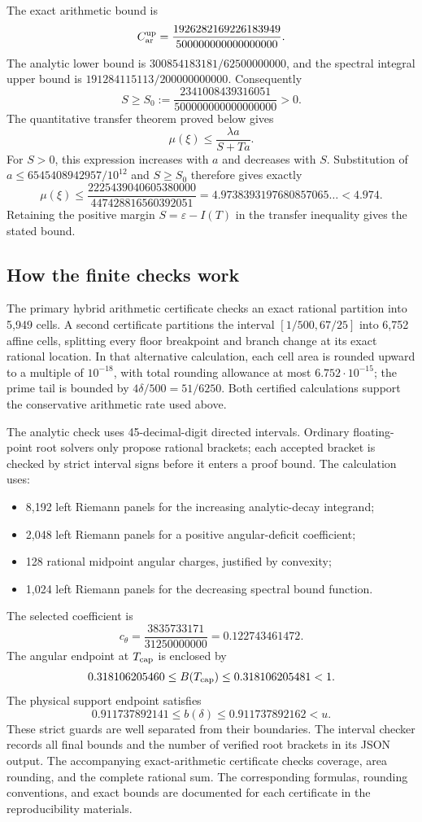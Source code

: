 \documentclass[11pt]{article}
\theoremstyle{definition}\newtheorem{definition}[theorem]{Definition}
\theoremstyle{remark}\newtheorem{remark}[theorem]{Remark}
\begin{document}
The exact arithmetic bound is
\[
 C_{\rm ar}^{\rm up}
 =\frac{1926282169226183949}{500000000000000000}.
\]
The analytic lower bound is $300854183181/62500000000$, and the spectral integral upper bound is $191284115113/200000000000$. Consequently
\[
 S\ge S_0:=\frac{2341008439316051}{500000000000000000}>0.
\]
The quantitative transfer theorem proved below gives
\[
 \mu(\xi)\le\frac{\lambda a}{S+Ta}.
\]
For $S>0$, this expression increases with $a$ and decreases with $S$. Substitution of $a\le6545408942957/10^{12}$ and $S\ge S_0$ therefore gives exactly
\[
 \mu(\xi)\le
 \frac{2225439040605380000}{447428816560392051}
 =4.9738393197680857065\ldots<4.974.
\]
Retaining the positive margin $S=\varepsilon-I(T)$ in the transfer inequality gives the stated bound.

\subsection{How the finite checks work}
The primary hybrid arithmetic certificate checks an exact rational partition into 5,949 cells. A second certificate partitions the interval $[1/500,67/25]$ into 6,752 affine cells, splitting every floor breakpoint and branch change at its exact rational location. In that alternative calculation, each cell area is rounded upward to a multiple of $10^{-18}$, with total rounding allowance at most $6.752\cdot10^{-15}$; the prime tail is bounded by $4\delta/500=51/6250$. Both certified calculations support the conservative arithmetic rate used above.

The analytic check uses 45-decimal-digit directed intervals. Ordinary floating-point root solvers only propose rational brackets; each accepted bracket is checked by strict interval signs before it enters a proof bound. The calculation uses:
\begin{itemize}
\item 8,192 left Riemann panels for the increasing analytic-decay integrand;
\item 2,048 left Riemann panels for a positive angular-deficit coefficient;
\item 128 rational midpoint angular charges, justified by convexity;
\item 1,024 left Riemann panels for the decreasing spectral bound function.
\end{itemize}
The selected coefficient is
\[
 c_\theta=\frac{3835733171}{31250000000}=0.122743461472.
\]
The angular endpoint at $T_{\rm cap}$ is enclosed by
\[
 0.318106205460\le B(T_{\rm cap})\le0.318106205481<1.
\]
The physical support endpoint satisfies
\[
 0.911737892141\le b(\delta)\le0.911737892162<u.
\]
These strict guards are well separated from their boundaries. The interval checker records all final bounds and the number of verified root brackets in its JSON output. The accompanying exact-arithmetic certificate checks coverage, area rounding, and the complete rational sum. The corresponding formulas, rounding conventions, and exact bounds are documented for each certificate in the reproducibility materials.
\end{document}
